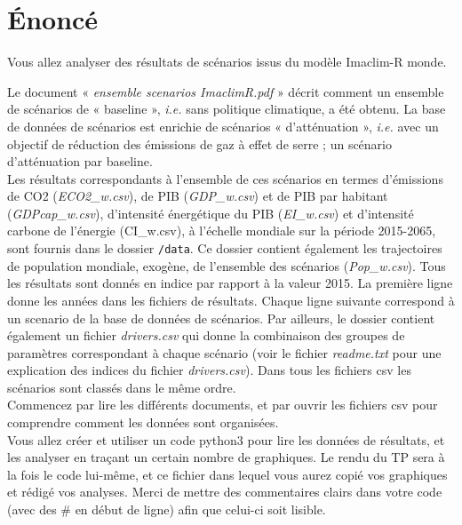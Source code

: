 \documentclass[a4,11pt]{aleph-notas}
\newcommand{\ans}[1]{
\begin{mdframed}[
    roundcorner=10pt,     %
    backgroundcolor=gray!20, %
    linecolor=black,      %
    linewidth=1pt,        %
    innertopmargin=10pt,  %
    innerbottommargin=10pt, %
    innerleftmargin=10pt,  %
    innerrightmargin=10pt  %
]
#1
\end{mdframed}
}
\begin{document}
\encabezado

\section*{\LARGE{Énoncé}}
\ans{
Vous allez analyser des résultats de scénarios issus du modèle Imaclim-R monde. 

Le document « \textit{ensemble scenarios ImaclimR.pdf} » décrit comment un ensemble de scénarios de « baseline », \textit{i.e.} sans politique climatique, a été obtenu. La base de données de scénarios est enrichie de scénarios « d’atténuation », \textit{i.e.} avec un objectif de réduction des émissions de gaz à effet de serre ; un scénario d’atténuation par baseline. \\

Les résultats correspondants à l’ensemble de ces scénarios en termes d’émissions de CO2 (\textit{ECO2\_w.csv}), de PIB (\textit{GDP\_w.csv}) et de PIB par habitant (\textit{GDPcap\_w.csv}), d’intensité énergétique du PIB (\textit{EI\_w.csv}) et d’intensité carbone de l’énergie (CI\_w.csv), à l’échelle mondiale sur la période 2015-2065, sont fournis dans le dossier \texttt{/data}. Ce dossier contient également les trajectoires de population mondiale, exogène, de l’ensemble des scénarios (\textit{Pop\_w.csv}). Tous les résultats sont donnés en indice par rapport à la valeur 2015. La première ligne donne les années dans les fichiers de résultats. Chaque ligne suivante correspond à un scenario de la base de données de scénarios. Par ailleurs, le dossier contient également un fichier \textit{drivers.csv} qui donne la combinaison des groupes de paramètres correspondant à chaque scénario (voir le fichier \textit{readme.txt} pour une explication des indices du fichier \textit{drivers.csv}). Dans tous les fichiers csv les scénarios sont classés dans le même ordre.  \\

Commencez par lire les différents documents, et par ouvrir les fichiers csv pour comprendre comment les données sont organisées. \\

Vous allez créer et utiliser un code python3 pour lire les données de résultats, et les analyser en traçant un certain nombre de graphiques. Le rendu du TP sera à la fois le code lui-même, et ce fichier dans lequel vous aurez copié vos graphiques et rédigé vos analyses. Merci de mettre des commentaires clairs dans votre code (avec des \# en début de ligne) afin que celui-ci soit lisible.}
\end{document}
